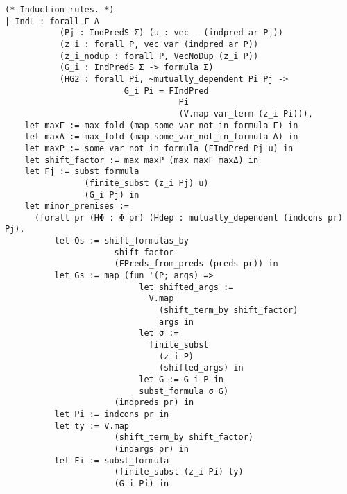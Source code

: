 \begin{verbatim}
(* Induction rules. *)
| IndL : forall Γ Δ
           (Pj : IndPredS Σ) (u : vec _ (indpred_ar Pj))
           (z_i : forall P, vec var (indpred_ar P))
           (z_i_nodup : forall P, VecNoDup (z_i P))
           (G_i : IndPredS Σ -> formula Σ)
           (HG2 : forall Pi, ~mutually_dependent Pi Pj ->
                        G_i Pi = FIndPred
                                   Pi
                                   (V.map var_term (z_i Pi))),
    let maxΓ := max_fold (map some_var_not_in_formula Γ) in
    let maxΔ := max_fold (map some_var_not_in_formula Δ) in
    let maxP := some_var_not_in_formula (FIndPred Pj u) in
    let shift_factor := max maxP (max maxΓ maxΔ) in
    let Fj := subst_formula
                (finite_subst (z_i Pj) u)
                (G_i Pj) in
    let minor_premises :=
      (forall pr (HΦ : Φ pr) (Hdep : mutually_dependent (indcons pr) Pj),
          let Qs := shift_formulas_by
                      shift_factor
                      (FPreds_from_preds (preds pr)) in
          let Gs := map (fun '(P; args) =>
                           let shifted_args :=
                             V.map
                               (shift_term_by shift_factor)
                               args in
                           let σ :=
                             finite_subst
                               (z_i P)
                               (shifted_args) in
                           let G := G_i P in
                           subst_formula σ G)
                      (indpreds pr) in
          let Pi := indcons pr in
          let ty := V.map
                      (shift_term_by shift_factor)
                      (indargs pr) in
          let Fi := subst_formula
                      (finite_subst (z_i Pi) ty)
                      (G_i Pi) in
          LKID (Qs ++ Gs ++ Γ ⊢ Fi :: Δ))
    in
    minor_premises ->
    LKID (Fj :: Γ ⊢ Δ) ->
    LKID (FIndPred Pj u :: Γ ⊢ Δ)
\end{verbatim}

Ilustrirajmo lijevo pravilo za induktivne predikatne simbole primjerima u Peanovoj aritmetici.
Kako se induktivna pravila sustava \(\mathit{LKID}\) odnose na proizvoljan skup induktivnih definicija \(\Phi\),
označimo s \(\mathit{LKID}_{\mathit{PA}}\)  sustav koji se odnosi na skup induktivnih defincija \(\Phi_{\mathit{PA}}\).
\begin{example}
  Za induktivni predikatni simbol \(\mathit{Nat}\)
  lijevo pravilo za indukciju u sustavu \(\mathit{LKID}_{\mathit{PA}}\) glasi:
  \begin{prooftree}
  \end{prooftree}
  \noindent gdje je G induktivna hipoteza vezana uz induktivni predikatni simbol \(\mathit{Nat}\),
  a \(x\) je varijabla koja se ne javlja u \(\Gamma\), \(\Delta\) ili \(\mathit{Nat}(t)\).
\end{example}

